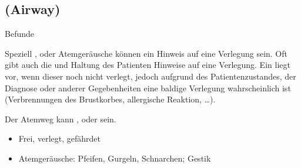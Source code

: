 \subsection{{}  (Airway)}

\label{topic:atemweg-apam}
\label{topic:airway-apam}


{}
{}
{}

\TextSlide
{{\eye} Befunde}
{Speziell ,  oder 
Atemgeräusche können ein Hinweis auf eine Verlegung sein.
Oft gibt auch die  und Haltung des Patienten
Hinweise auf eine Verlegung. 
Ein  liegt vor, wenn dieser noch nicht
verlegt, jedoch aufgrund des Patientenzustandes, der
Diagnose oder anderer Gegebenheiten eine baldige Verlegung
wahrscheinlich ist (Verbrennungen des Brustkorbes, allergische Reaktion, \ldots).

Der Atemweg kann ,
 oder  sein.
}
{
\begin{itemize}
  \item Frei, verlegt, gefährdet
  \item Atemgeräusche: Pfeifen, Gurgeln, Schnarchen;
  Gestik
\end{itemize}
}
{}
{}
{}


